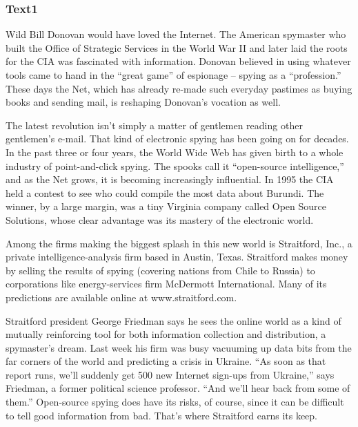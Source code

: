 \documentclass[a4paper]{article}
\begin{document}
\subsubsection{Text1}

\par
Wild Bill Donovan would have loved the Internet. The American spymaster who built the Office of Strategic Services in the World War II and later laid the roots for the CIA was fascinated with information. Donovan believed in using whatever tools came to hand in the “great game” of espionage -- spying as a “profession.” These days the Net, which has already re-made such everyday pastimes as buying books and sending mail, is reshaping Donovan’s vocation as well.

\par
The latest revolution isn’t simply a matter of gentlemen reading other gentlemen’s e-mail. That kind of electronic spying has been going on for decades. In the past three or four years, the World Wide Web has given birth to a whole industry of point-and-click spying. The spooks call it “open-source intelligence,” and as the Net grows, it is becoming increasingly influential. In 1995 the CIA held a contest to see who could compile the most data about Burundi. The winner, by a large margin, was a tiny Virginia company called Open Source Solutions, whose clear advantage was its mastery of the electronic world.

\par
Among the firms making the biggest splash in this new world is Straitford, Inc., a private intelligence-analysis firm based in Austin, Texas. Straitford makes money by selling the results of spying (covering nations from Chile to Russia) to corporations like energy-services firm McDermott International. Many of its predictions are available online at www.straitford.com.

\par
Straitford president George Friedman says he sees the online world as a kind of mutually reinforcing tool for both information collection and distribution, a spymaster’s dream. Last week his firm was busy vacuuming up data bits from the far corners of the world and predicting a crisis in Ukraine. “As soon as that report runs, we’ll suddenly get 500 new Internet sign-ups from Ukraine,” says Friedman, a former political science professor. “And we’ll hear back from some of them.” Open-source spying does have its risks, of course, since it can be difficult to tell good information from bad. That’s where Straitford earns its keep.
\end{document}
